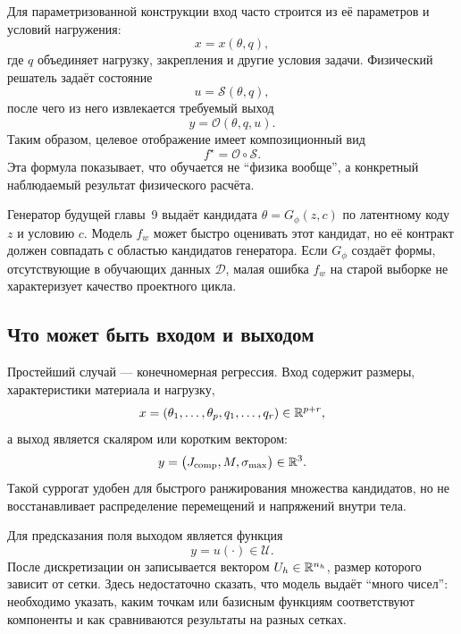 Для параметризованной конструкции вход часто строится из её параметров и условий нагружения:
\begin{equation}
 x=x(\theta,q),
\end{equation}
где $q$ объединяет нагрузку, закрепления и другие условия задачи. Физический решатель задаёт состояние
\begin{equation}
 u=\mathcal S(\theta,q),
\end{equation}
после чего из него извлекается требуемый выход
\begin{equation}
 y=\mathcal O(\theta,q,u).
\end{equation}
Таким образом, целевое отображение имеет композиционный вид
\begin{equation}
 f^\star
 =
 \mathcal O\circ\mathcal S.
\end{equation}
Эта формула показывает, что обучается не ``физика вообще'', а конкретный наблюдаемый результат физического расчёта.

\begin{connection}
Генератор будущей главы~9 выдаёт кандидата $\theta=G_\phi(z,c)$ по латентному коду $z$ и условию $c$. Модель $f_w$ может быстро оценивать этот кандидат, но её контракт должен совпадать с областью кандидатов генератора. Если $G_\phi$ создаёт формы, отсутствующие в обучающих данных $\mathcal D$, малая ошибка $f_w$ на старой выборке не характеризует качество проектного цикла.
\end{connection}

\subsection{Что может быть входом и выходом}
Простейший случай --- конечномерная регрессия. Вход содержит размеры, характеристики материала и нагрузку,
\begin{equation}
 x
 =
 (\theta_1,\ldots,\theta_p,q_1,\ldots,q_r)
 \in\mathbb{R}^{p+r},
\end{equation}
а выход является скаляром или коротким вектором:
\begin{equation}
 y
 =
 \bigl(
 J_{\mathrm{comp}},
 M,
 \sigma_{\max}
 \bigr)
 \in\mathbb{R}^3.
\end{equation}
Такой суррогат удобен для быстрого ранжирования множества кандидатов, но не восстанавливает распределение перемещений и напряжений внутри тела.

Для предсказания поля выходом является функция
\begin{equation}
 y=u(\cdot)\in\mathcal U.
\end{equation}
После дискретизации он записывается вектором $U_h\in\mathbb{R}^{n_h}$, размер которого зависит от сетки. Здесь недостаточно сказать, что модель выдаёт ``много чисел'': необходимо указать, каким точкам или базисным функциям соответствуют компоненты и как сравниваются результаты на разных сетках.


